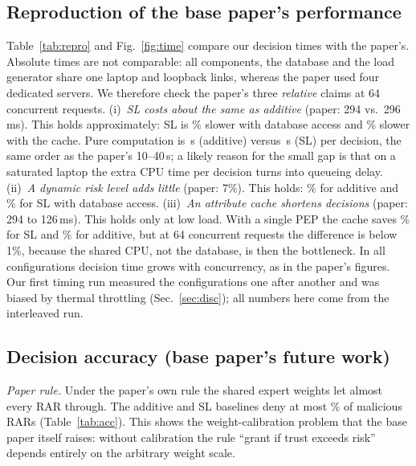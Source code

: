 \documentclass[conference,a4paper]{IEEEtran}
\begin{document}
\subsection{Reproduction of the base paper's performance}\label{sec:repro}

Table~\ref{tab:repro} and Fig.~\ref{fig:time} compare our decision times with the paper's. Absolute times are not comparable: all components, the database and the load generator share one laptop and loopback links, whereas the paper used four dedicated servers. We therefore check the paper's three \emph{relative} claims at 64 concurrent requests. (i)~\emph{SL costs about the same as additive} (paper: 294 vs.\ 296\,ms). This holds approximately: SL is \SLvsAddSDB\% slower with database access and \SLvsAddSC\% slower with the cache. Pure computation is \UsAddS\,\textmu s (additive) versus \UsSLS\,\textmu s (SL) per decision, the same order as the paper's 10--40\,\textmu s; a likely reason for the small gap is that on a saturated laptop the extra CPU time per decision turns into queueing delay. (ii)~\emph{A dynamic risk level adds little} (paper: 7\%). This holds: \DynAddDB\% for additive and \DynSLDB\% for SL with database access. (iii)~\emph{An attribute cache shortens decisions} (paper: 294 to 126\,ms). This holds only at low load. With a single PEP the cache saves \CacheSaveOneS\% for SL and \CacheSaveOneAddS\% for additive, but at 64 concurrent requests the difference is below 1\%, because the shared CPU, not the database, is then the bottleneck. In all configurations decision time grows with concurrency, as in the paper's figures. Our first timing run measured the configurations one after another and was biased by thermal throttling (Sec.~\ref{sec:disc}); all numbers here come from the interleaved run.



\subsection{Decision accuracy (base paper's future work)}\label{sec:acc}
\emph{Paper rule.} Under the paper's own rule the shared expert weights let almost every RAR through. The additive and SL baselines deny at most \PrRecSLD\% of malicious RARs (Table~\ref{tab:acc}). This shows the weight-calibration problem that the base paper itself raises: without calibration the rule ``grant if trust exceeds risk'' depends entirely on the arbitrary weight scale.
\end{document}
